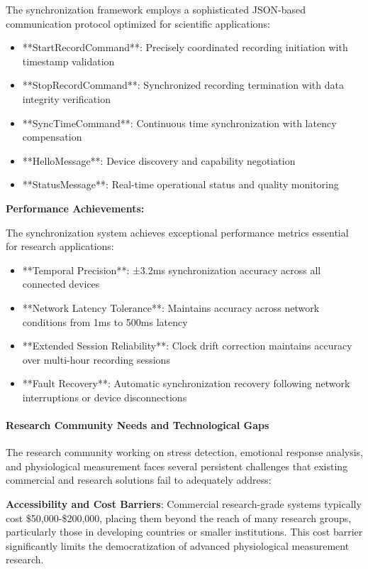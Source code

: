\documentclass[12pt,a4paper]{report}
\begin{document}
The synchronization framework employs a sophisticated JSON-based communication protocol optimized for scientific
applications:

\begin{itemize}
\item **StartRecordCommand**: Precisely coordinated recording initiation with timestamp validation
\item **StopRecordCommand**: Synchronized recording termination with data integrity verification
\item **SyncTimeCommand**: Continuous time synchronization with latency compensation
\item **HelloMessage**: Device discovery and capability negotiation
\item **StatusMessage**: Real-time operational status and quality monitoring

\end{itemize}
\textbf{Performance Achievements:}

The synchronization system achieves exceptional performance metrics essential for research applications:

\begin{itemize}
\item **Temporal Precision**: ±3.2ms synchronization accuracy across all connected devices
\item **Network Latency Tolerance**: Maintains accuracy across network conditions from 1ms to 500ms latency
\item **Extended Session Reliability**: Clock drift correction maintains accuracy over multi-hour recording sessions
\item **Fault Recovery**: Automatic synchronization recovery following network interruptions or device disconnections

\end{itemize}
\paragraph{Research Community Needs and Technological Gaps}

The research community working on stress detection, emotional response analysis, and physiological measurement faces
several persistent challenges that existing commercial and research solutions fail to adequately address:

\textbf{Accessibility and Cost Barriers}: Commercial research-grade systems typically cost \$50,000-\$200,000, placing them
beyond the reach of many research groups, particularly those in developing countries or smaller institutions. This cost
barrier significantly limits the democratization of advanced physiological measurement research.
\end{document}
